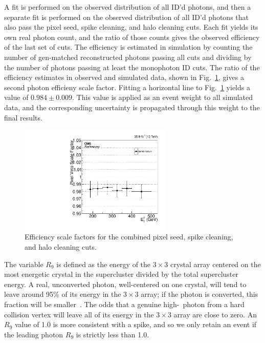 A fit is performed on the observed distribution of all ID'd photons, and then a separate fit is performed on the observed distribution of
all ID'd photons that also pass the pixel seed, spike cleaning, and halo cleaning cuts. Each fit yields its own real photon count, and the ratio of those counts gives the observed efficiency
of the last set of cuts. The efficiency is estimated in simulation by counting the number of gen-matched reconstructed photons passing all cuts and
dividing by the number of photons passing at least the monophoton ID cuts. The ratio of the efficiency estimates in observed and simulated data, shown in Fig.~\ref{fig:pixseed_SF},
gives a second photon efficieny scale factor. Fitting a horizontal line to Fig.~\ref{fig:pixseed_SF} yields a value of $0.984 \pm 0.009$. This value is applied
as an event weight to all simulated data, and the corresponding uncertainty is propagated through this weight to the final results.

\begin{figure}[hbtp]
  \begin{center}
    \includegraphics[width=0.65\textwidth]{Figures/pixseed_SF.pdf}
    \caption{
    Efficiency scale factors for the combined pixel seed, spike cleaning, and halo cleaning cuts.
    }
    \label{fig:pixseed_SF}
  \end{center}
\end{figure}

The variable $R_{9}$ is defined as the energy of the $3{\times}3$ crystal array centered on the most energetic crystal in the supercluster divided by the total supercluster energy.
A real, unconverted photon, well-centered on one crystal, will tend to leave around 95\% of its energy in the $3{\times}3$ array; if the photon is converted, this fraction will
be smaller~\cite{ref:1748-0221/10/08/P08010}. The odds that a genuine high-\pT\ photon from a hard collision vertex will leave all of its energy in the $3{\times}3$ array
are close to zero. An $R_{9}$ value of 1.0 is more consistent with a spike, and so we only retain an event if the leading photon $R_{9}$ is strictly less than 1.0.

